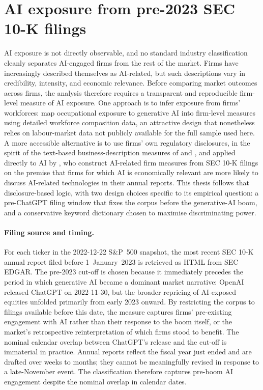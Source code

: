 \section{AI exposure from pre-2023 SEC 10-K filings}
\label{sec:ai-exposure}

AI exposure is not directly observable, and no standard industry classification cleanly separates AI-engaged firms from the rest of the market. Firms have increasingly described themselves as AI-related, but such descriptions vary in credibility, intensity, and economic relevance. Before comparing market outcomes across firms, the analysis therefore requires a transparent and reproducible firm-level measure of AI exposure. One approach is to infer exposure from firms' workforces: \citet{eisfeldtSchubertZhangTaska2023} map occupational exposure to generative AI into firm-level measures using detailed workforce composition data, an attractive design that nonetheless relies on labour-market data not publicly available for the full sample used here. A more accessible alternative is to use firms' own regulatory disclosures, in the spirit of the text-based business-description measures of \citet{loughranMcDonald2011} and \citet{hobergPhillips2016}, and applied directly to AI by \citet{anteSaggu2025}, who construct AI-related firm measures from SEC 10-K filings on the premise that firms for which AI is economically relevant are more likely to discuss AI-related technologies in their annual reports. This thesis follows that disclosure-based logic, with two design choices specific to its empirical question: a pre-ChatGPT filing window that fixes the corpus before the generative-AI boom, and a conservative keyword dictionary chosen to maximise discriminating power.

\paragraph{Filing source and timing.} For each ticker in the 2022-12-22 S\&P~500 snapshot, the most recent SEC 10-K annual report filed before 1~January~2023 is retrieved as HTML from SEC EDGAR. The pre-2023 cut-off is chosen because it immediately precedes the period in which generative AI became a dominant market narrative: OpenAI released ChatGPT on 2022-11-30, but the broader repricing of AI-exposed equities unfolded primarily from early 2023 onward. By restricting the corpus to filings available before this date, the measure captures firms' pre-existing engagement with AI rather than their response to the boom itself, or the market's retrospective reinterpretation of which firms stood to benefit. The nominal calendar overlap between ChatGPT's release and the cut-off is immaterial in practice. Annual reports reflect the fiscal year just ended and are drafted over weeks to months; they cannot be meaningfully revised in response to a late-November event. The classification therefore captures pre-boom AI engagement despite the nominal overlap in calendar dates.

